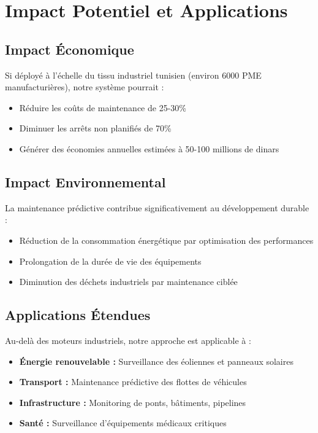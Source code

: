 \section*{Impact Potentiel et Applications}

\subsection*{Impact Économique}

Si déployé à l'échelle du tissu industriel tunisien (environ 6000 PME manufacturières), notre système pourrait :
\begin{itemize}
    \item Réduire les coûts de maintenance de 25-30\%
    \item Diminuer les arrêts non planifiés de 70\%
    \item Générer des économies annuelles estimées à 50-100 millions de dinars
\end{itemize}

\subsection*{Impact Environnemental}

La maintenance prédictive contribue significativement au développement durable :
\begin{itemize}
    \item Réduction de la consommation énergétique par optimisation des performances
    \item Prolongation de la durée de vie des équipements
    \item Diminution des déchets industriels par maintenance ciblée
\end{itemize}

\subsection*{Applications Étendues}

Au-delà des moteurs industriels, notre approche est applicable à :
\begin{itemize}
    \item \textbf{Énergie renouvelable :} Surveillance des éoliennes et panneaux solaires
    \item \textbf{Transport :} Maintenance prédictive des flottes de véhicules
    \item \textbf{Infrastructure :} Monitoring de ponts, bâtiments, pipelines
    \item \textbf{Santé :} Surveillance d'équipements médicaux critiques
\end{itemize}

